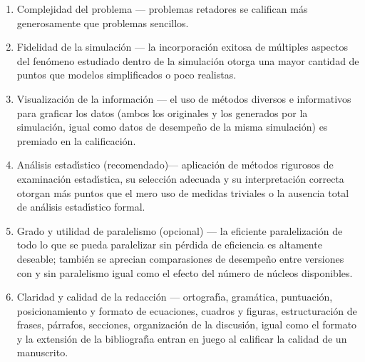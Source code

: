 \begin{enumerate}[itemsep=-2pt]
\item{Complejidad del problema --- problemas retadores se califican
    m\'{a}s generosamente que problemas sencillos.}
\item{Fidelidad de la
    simulaci\'{o}n --- la incorporaci\'{o}n exitosa de m\'{u}ltiples aspectos del
    fen\'{o}meno estudiado dentro de la simulaci\'{o}n otorga una mayor
    cantidad de puntos que modelos simplificados o poco realistas.}
\item{Visualizaci\'{o}n de la informaci\'{o}n --- el uso de m\'{e}todos diversos e
    informativos para graficar los datos (ambos los originales y los
    generados por la simulaci\'{o}n, igual como datos de desempe\~{n}o de la
    misma simulaci\'{o}n) es premiado en la calificaci\'{o}n.}
\item{An\'{a}lisis estad\'{\i}stico (recomendado)--- aplicaci\'{o}n de
    m\'{e}todos rigurosos de examinaci\'{o}n estad\'{\i}stica, su
    selecci\'{o}n adecuada y su interpretaci\'{o}n correcta otorgan
    m\'{a}s puntos que el mero uso de medidas triviales o la ausencia
    total de an\'{a}lisis estad\'{\i}stico formal.}
\item{Grado y utilidad de paralelismo (opcional) --- la eficiente
    paralelizaci\'{o}n de todo lo que se pueda paralelizar sin
    p\'{e}rdida de eficiencia es altamente deseable; tambi\'{e}n se
    aprecian comparasiones de desempe\~{n}o entre versiones con y sin
    paralelismo igual como el efecto del n\'{u}mero de n\'{u}cleos
    disponibles.}
\item{Claridad y calidad de la redacci\'{o}n --- ortograf\'{\i}a,
    gram\'{a}tica, puntuaci\'{o}n, posicionamiento y formato de
    ecuaciones, cuadros y figuras, estructuraci\'{o}n de frases,
    p\'{a}rrafos, secciones, organizaci\'{o}n de la discusi\'{o}n,
    igual como el formato y la extensi\'{o}n de la bibliograf\'{\i}a
    entran en juego al calificar la calidad de un manuscrito.}
\end{enumerate}
